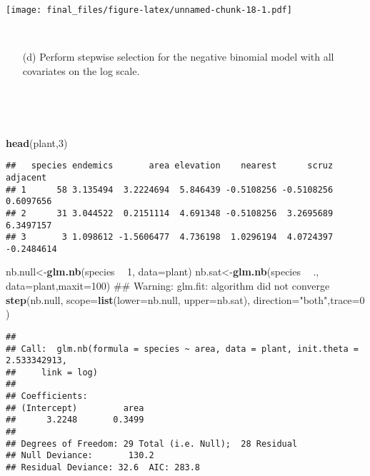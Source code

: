 \documentclass[]{article}
\newenvironment{Shaded}{\begin{snugshade}}{\end{snugshade}}
\newcommand{\KeywordTok}[1]{\textcolor[rgb]{0.13,0.29,0.53}{\textbf{#1}}}
\newcommand{\DataTypeTok}[1]{\textcolor[rgb]{0.13,0.29,0.53}{#1}}
\newcommand{\DecValTok}[1]{\textcolor[rgb]{0.00,0.00,0.81}{#1}}
\newcommand{\StringTok}[1]{\textcolor[rgb]{0.31,0.60,0.02}{#1}}
\newcommand{\OperatorTok}[1]{\textcolor[rgb]{0.81,0.36,0.00}{\textbf{#1}}}
\newcommand{\NormalTok}[1]{#1}
\begin{document}
\texttt{[image: final\_files/figure-latex/unnamed-chunk-18-1.pdf]}

~

\begin{itemize}
\item[(d)] Perform stepwise selection for the negative binomial model with all covariates on the log scale.
\end{itemize}

~

~

\begin{Shaded}
\begin{Highlighting}[]
\KeywordTok{head}\NormalTok{(plant,}\DecValTok{3}\NormalTok{)}
\end{Highlighting}
\end{Shaded}

\begin{verbatim}
##   species endemics       area elevation    nearest      scruz   adjacent
## 1      58 3.135494  3.2224694  5.846439 -0.5108256 -0.5108256  0.6097656
## 2      31 3.044522  0.2151114  4.691348 -0.5108256  3.2695689  6.3497157
## 3       3 1.098612 -1.5606477  4.736198  1.0296194  4.0724397 -0.2484614
\end{verbatim}

\begin{Shaded}
\begin{Highlighting}[]
\NormalTok{nb.null<-}\KeywordTok{glm.nb}\NormalTok{(species }\OperatorTok{~}\StringTok{ }\DecValTok{1}\NormalTok{, }\DataTypeTok{data=}\NormalTok{plant)}
\NormalTok{nb.sat<-}\KeywordTok{glm.nb}\NormalTok{(species }\OperatorTok{~}\StringTok{ }\NormalTok{., }\DataTypeTok{data=}\NormalTok{plant,}\DataTypeTok{maxit=}\DecValTok{100}\NormalTok{) ## Warning: glm.fit: algorithm did not converge}
\KeywordTok{step}\NormalTok{(nb.null, }\DataTypeTok{scope=}\KeywordTok{list}\NormalTok{(}\DataTypeTok{lower=}\NormalTok{nb.null,     }\DataTypeTok{upper=}\NormalTok{nb.sat), }\DataTypeTok{direction=}\StringTok{"both"}\NormalTok{,}\DataTypeTok{trace=}\DecValTok{0}\NormalTok{  )}
\end{Highlighting}
\end{Shaded}

\begin{verbatim}
## 
## Call:  glm.nb(formula = species ~ area, data = plant, init.theta = 2.533342913, 
##     link = log)
## 
## Coefficients:
## (Intercept)         area  
##      3.2248       0.3499  
## 
## Degrees of Freedom: 29 Total (i.e. Null);  28 Residual
## Null Deviance:       130.2 
## Residual Deviance: 32.6  AIC: 283.8
\end{verbatim}
\end{document}
